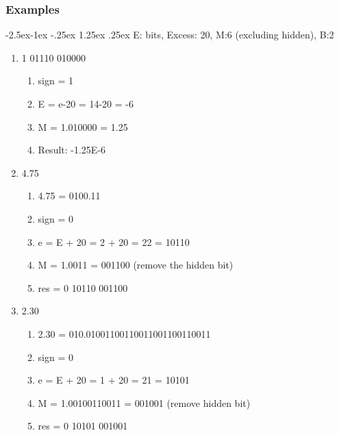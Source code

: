\documentclass[11pt, a4paper]{article}
\makeatletter
\renewcommand\paragraph{\@startsection{paragraph}{4}{\z@}%
            {-2.5ex\@plus -1ex \@minus -.25ex}%
            {1.25ex \@plus .25ex}%
            {\normalfont\normalsize\bfseries}}
\makeatother
\begin{document}
\subsubsection{Examples}
\paragraph{E: bits, Excess: 20, M:6 (excluding hidden), B:2}
\begin{enumerate}
    \item 1 01110 010000
    \begin{enumerate}
        \item sign = 1
        \item E = e-20 = 14-20 = -6
        \item M = 1.010000 = 1.25
        \item Result: -1.25E-6
    \end{enumerate}
    \item 4.75
    \begin{enumerate}
        \item 4.75 = 0100.11
        \item sign = 0
        \item e = E + 20 = 2 + 20 = 22 = 10110
        \item M = 1.0011 = 001100 (remove the hidden bit)
        \item res = 0 10110 001100
    \end{enumerate}
    \item 2.30
    \begin{enumerate}
        \item 2.30 = 010.01001100110011001100110011
        \item sign = 0
        \item e = E + 20 = 1 + 20 = 21 = 10101
        \item M = 1.00100110011 = 001001 (remove hidden bit)
        \item res = 0 10101 001001
    \end{enumerate}
\end{enumerate}
\end{document}
